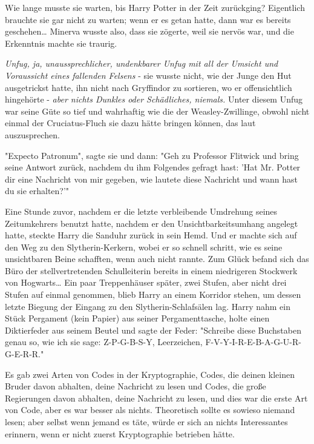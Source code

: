 {Wie lange musste sie warten, bis Harry Potter in der Zeit zurückging? Eigentlich brauchte sie gar nicht zu warten; wenn er es getan hatte, dann war es bereits geschehen… Minerva wusste also, dass sie zögerte, weil sie nervös war, und die Erkenntnis machte sie traurig.

\emph{Unfug, ja, unaussprechlicher, undenkbarer Unfug mit all der Umsicht und Voraussicht eines fallenden Felsens} - sie wusste nicht, wie der Junge den Hut ausgetrickst hatte, ihn nicht nach Gryffindor zu sortieren, wo er offensichtlich hingehörte - \emph{aber nichts Dunkles oder Schädliches, niemals.} Unter diesem Unfug war seine Güte so tief und wahrhaftig wie die der Weasley-Zwillinge, obwohl nicht einmal der Cruciatus-Fluch sie dazu hätte bringen können, das laut auszusprechen.

"Expecto Patronum", sagte sie und dann: "Geh zu Professor Flitwick und bring seine Antwort zurück, nachdem du ihm Folgendes gefragt hast: 'Hat Mr. Potter dir eine Nachricht von mir gegeben, wie lautete diese Nachricht und wann hast du sie erhalten?'"

Eine Stunde zuvor, nachdem er die letzte verbleibende Umdrehung seines Zeitumkehrers benutzt hatte, nachdem er den Unsichtbarkeitsumhang angelegt hatte, steckte Harry die Sanduhr zurück in sein Hemd. Und er machte sich auf den Weg zu den Slytherin-Kerkern, wobei er so schnell schritt, wie es seine unsichtbaren Beine schafften, wenn auch nicht rannte. Zum Glück befand sich das Büro der stellvertretenden Schulleiterin bereits in einem niedrigeren Stockwerk von Hogwarts… Ein paar Treppenhäuser später, zwei Stufen, aber nicht drei Stufen auf einmal genommen, blieb Harry an einem Korridor stehen, um dessen letzte Biegung der Eingang zu den Slytherin-Schlafsälen lag. Harry nahm ein Stück Pergament (kein Papier) aus seiner Pergamenttasche, holte einen Diktierfeder aus seinem Beutel und sagte der Feder: "Schreibe diese Buchstaben genau so, wie ich sie sage: Z-P-G-B-S-Y, Leerzeichen, F-V-Y-I-R-E-B-A-G-U-R-G-E-R-R."

Es gab zwei Arten von Codes in der Kryptographie, Codes, die deinen kleinen Bruder davon abhalten, deine Nachricht zu lesen und Codes, die große Regierungen davon abhalten, deine Nachricht zu lesen, und dies war die erste Art von Code, aber es war besser als nichts. Theoretisch sollte es sowieso niemand lesen; aber selbst wenn jemand es täte, würde er sich an nichts Interessantes erinnern, wenn er nicht zuerst Kryptographie betrieben hätte.

}
